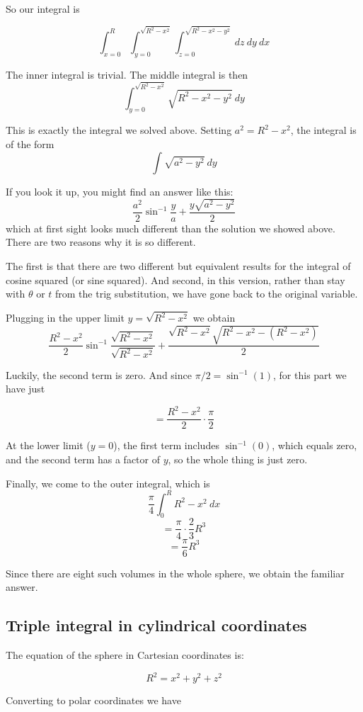 \documentclass[11pt, oneside]{article}
\begin{document}
So our integral is

\[ \int_{x=0}^{R} \int_{y=0}^{\sqrt{R^2-x^2}} \int_{z=0}^{\sqrt{R^2 - x^2 - y^2}} \ dz \ dy \ dx \]

The inner integral is trivial.  The middle integral is then
\[ \int_{y=0}^{\sqrt{R^2-x^2}} \sqrt{R^2 - x^2 - y^2} \ dy \]

This is exactly the integral we solved above.  Setting $a^2 = R^2 - x^2$, the integral is of the form
\[ \int \sqrt{a^2 - y^2} \ dy \]

If you look it up, you might find an answer like this:
\[ \frac{a^2}{2} \sin^{-1} \frac{y}{a} + \frac{y \sqrt{a^2-y^2}}{2} \]
which at first sight looks much different than the solution we showed above.  There are two reasons why it is so different.  

The first is that there are two different but equivalent results for the integral of cosine squared (or sine squared).  And second, in this version, rather than stay with $\theta$ or $t$ from the trig substitution, we have gone back to the original variable.

Plugging in the upper limit $y= \sqrt{R^2-x^2}$ we obtain
\[ \frac{R^2 - x^2}{2} \sin^{-1} \frac{\sqrt{R^2-x^2}}{\sqrt{R^2-x^2}} + \frac{\sqrt{R^2-x^2} \sqrt{R^2-x^2 - (R^2-x^2)}}{2} \]

Luckily, the second term is zero.  And since $\pi/2 =  \sin^{-1} (1)$, for this part we have just

\[ = \frac{R^2 - x^2}{2} \cdot \frac{\pi}{2} \]

At the lower limit ($y=0$), the first term includes $\sin^{-1} (0)$, which equals zero, and the second term has a factor of $y$, so the whole thing is just zero.

Finally, we come to the outer integral, which is
\[ \frac{\pi}{4} \int_0^R R^2 - x^2 \ dx \]
\[ = \frac{\pi}{4} \cdot \frac{2}{3} R^3 \]
\[ = \frac{\pi}{6} R^3 \]

Since there are eight such volumes in the whole sphere, we obtain the familiar answer.

\subsection*{Triple integral in cylindrical coordinates}
 
The equation of the sphere in Cartesian coordinates is:

\[ R^2 = x^2 + y^2 + z^2 \]

Converting to polar coordinates we have 
\end{document}

